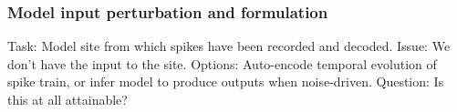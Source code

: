 \documentclass[mphil,deptreport,ianc]{infthesis} %
\begin{document}







\subsubsection{Model input perturbation and formulation}

Task: Model site from which spikes have been recorded and decoded. Issue: We don’t have the input to the site. Options: Auto-encode temporal evolution of spike train, or infer model to produce outputs when noise-driven. Question: Is this at all attainable?
\end{document}
